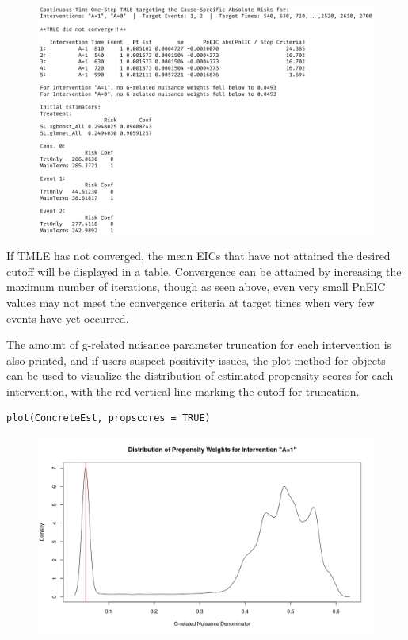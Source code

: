 \documentclass{report}
\newcommand{\1}{\ensuremath{\mathbf{1}}}
\begin{document}
\begin{figure}[H]
\center
\includegraphics[width=\linewidth]{fig/ConcreteEst.png}
\end{figure}

If TMLE has not converged, the mean EICs that have not attained the desired cutoff will be displayed in a table. Convergence can be attained by increasing the maximum number of iterations, though as seen above, even very small PnEIC values may not meet the convergence criteria at target times when very few events have yet occurred.

The amount of g-related nuisance parameter truncation for each intervention is also printed, and if users suspect positivity issues, the plot method for  objects can be used to visualize the distribution of estimated propensity scores for each intervention, with the red vertical line marking the cutoff for truncation. 

\begin{lstlisting}
plot(ConcreteEst, propscores = TRUE)
\end{lstlisting}

\begin{figure}[H]
\center
\includegraphics[width=\linewidth]{fig/A1-propscores.png}
\end{figure}
\end{document}
